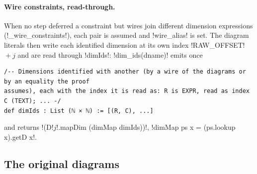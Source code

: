 {\paragraph{Wire constraints, read-through.} When no step deferred a constraint but wires join
different dimension expressions (\py!_wire_constraints!), each pair is assumed and
\py!wire_alias! is set. The diagram literals then write each identified dimension at its own
index \py!RAW_OFFSET!${}+j$ and are read through \code!dimIds!: \py!dim_ids(dname)! emits once
\begin{lstlisting}[style=grammar]
/-- Dimensions identified with another (by a wire of the diagrams or by an equality the proof
assumes), each with the index it is read as: R is EXPR, read as index C (TEXT); ... -/
def dimIds : List (ℕ × ℕ) := [(R, C), ...]
\end{lstlisting}
and returns \code!(D!$j$\code!.mapDim (dimMap dimIds))!, \lean!dimMap ps x = (ps.lookup x).getD x!.

\subsection{The original diagrams}\label{sec:lean-export-net-original}

}
